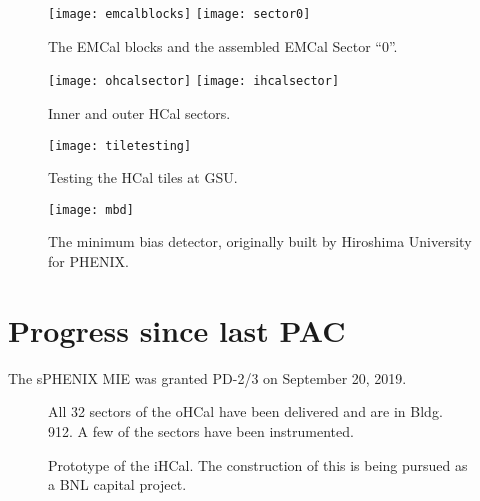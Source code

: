 \begin{figure}[hbt!]
  \centering
  \texttt{[image: emcalblocks]}
  \hfill
  \texttt{[image: sector0]}
  \caption{The EMCal blocks and the assembled EMCal Sector ``0''.}
  \label{fig:emcal}
\end{figure}

\begin{figure}[hbt!]
  \centering
  \texttt{[image: ohcalsector]}
  \hfill
  \texttt{[image: ihcalsector]}
  \caption{Inner and outer HCal sectors.}
  \label{fig:hcal}
\end{figure}

\begin{figure}[hbt!]
  \centering
  \texttt{[image: tiletesting]}
  \caption{Testing the HCal tiles at GSU.}
  \label{fig:tiletesting}
\end{figure}

\begin{figure}[hbt!]
  \centering
  \texttt{[image: mbd]}
  \caption{The minimum bias detector, originally built by Hiroshima
    University for PHENIX.}
  \label{fig:mbd}
\end{figure}




\section{Progress since last PAC}
\label{sec:progress}

The sPHENIX MIE was granted PD-2/3 on September 20, 2019.

\begin{figure}[!hbt]
 \begin{center}
        \caption{\label{fig:ohcal}All 32 sectors of the oHCal have
        been delivered and are in Bldg. 912.  A few of the sectors have
        been instrumented.}
 \end{center}
\end{figure}

\begin{figure}[!hbt]
 \begin{center}
        \caption{\label{fig:ihcal}Prototype of the iHCal.  The
        construction of this is being pursued as a BNL capital project.}
 \end{center}
\end{figure}

